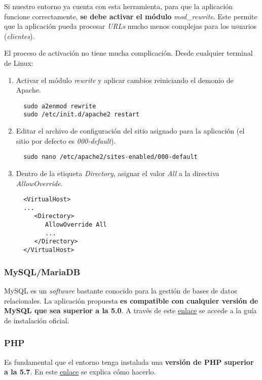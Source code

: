 Si nuestro entorno ya cuenta con esta herramienta, para que la
aplicación funcione correctamente, \textbf{se debe activar el módulo}
\emph{mod\_rewrite}. Este permite que la aplicación pueda procesar
\emph{URLs} mucho menos complejas para los usuarios (\emph{clientes}).

El proceso de activación no tiene mucha complicación. Desde cualquier
terminal de Linux:

\begin{enumerate}
\def\labelenumi{\arabic{enumi}.}
\tightlist
\item
  Activar el módulo \emph{rewrite} y aplicar cambios reiniciando el
  demonio de Apache.
  \begin{verbatim}
  sudo a2enmod rewrite
  sudo /etc/init.d/apache2 restart
  \end{verbatim}
\item
  Editar el archivo de configuración del sitio asignado para la
  aplicación (el sitio por defecto es \emph{000-default}).
  \begin{verbatim}
  sudo nano /etc/apache2/sites-enabled/000-default
  \end{verbatim}
\item
  Dentro de la etiqueta \emph{Directory}, asignar el valor \emph{All} a
  la directiva \emph{AllowOverride}.
  
  \begin{verbatim}
  <VirtualHost>
  ...
     <Directory>
        AllowOverride All
        ...
     </Directory>
  </VirtualHost>
  \end{verbatim}
\end{enumerate}

\subsubsection{MySQL/MariaDB}

MySQL es un \emph{software} bastante conocido para la gestión de bases
de datos relacionales. La aplicación propuesta \textbf{es compatible con
cualquier versión de MySQL que sea superior a la 5.0}. A través de este
\href{https://dev.mysql.com/doc/mysql-installation-excerpt/5.7/en/}{enlace}
se accede a la guía de instalación oficial.

\subsubsection{PHP}

Es fundamental que el entorno tenga instalada una \textbf{versión de PHP
superior a la 5.7}. En este
\href{https://www.php.net/manual/es/install.php}{enlace} se explica cómo
hacerlo.

